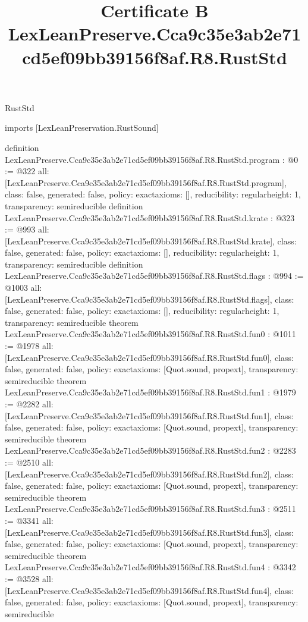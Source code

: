\begin{lexlean}{RustStd}
\title{Certificate B LexLeanPreserve.Cca9c35e3ab2e71cd5ef09bb39156f8af.R8.RustStd}
\begin{coremodule}
imports [LexLeanPreservation.RustSound]

definition LexLeanPreserve.Cca9c35e3ab2e71cd5ef09bb39156f8af.R8.RustStd.program : @0 := @322 {
  all: [LexLeanPreserve.Cca9c35e3ab2e71cd5ef09bb39156f8af.R8.RustStd.program],
  class: false,
  generated: false,
  policy: exact{axioms: []},
  reducibility: regular{height: 1},
  transparency: semireducible
}
definition LexLeanPreserve.Cca9c35e3ab2e71cd5ef09bb39156f8af.R8.RustStd.krate : @323 := @993 {
  all: [LexLeanPreserve.Cca9c35e3ab2e71cd5ef09bb39156f8af.R8.RustStd.krate],
  class: false,
  generated: false,
  policy: exact{axioms: []},
  reducibility: regular{height: 1},
  transparency: semireducible
}
definition LexLeanPreserve.Cca9c35e3ab2e71cd5ef09bb39156f8af.R8.RustStd.flags : @994 := @1003 {
  all: [LexLeanPreserve.Cca9c35e3ab2e71cd5ef09bb39156f8af.R8.RustStd.flags],
  class: false,
  generated: false,
  policy: exact{axioms: []},
  reducibility: regular{height: 1},
  transparency: semireducible
}
theorem LexLeanPreserve.Cca9c35e3ab2e71cd5ef09bb39156f8af.R8.RustStd.fun0 : @1011 := @1978 {
  all: [LexLeanPreserve.Cca9c35e3ab2e71cd5ef09bb39156f8af.R8.RustStd.fun0],
  class: false,
  generated: false,
  policy: exact{axioms: [Quot.sound, propext]},
  transparency: semireducible
}
theorem LexLeanPreserve.Cca9c35e3ab2e71cd5ef09bb39156f8af.R8.RustStd.fun1 : @1979 := @2282 {
  all: [LexLeanPreserve.Cca9c35e3ab2e71cd5ef09bb39156f8af.R8.RustStd.fun1],
  class: false,
  generated: false,
  policy: exact{axioms: [Quot.sound, propext]},
  transparency: semireducible
}
theorem LexLeanPreserve.Cca9c35e3ab2e71cd5ef09bb39156f8af.R8.RustStd.fun2 : @2283 := @2510 {
  all: [LexLeanPreserve.Cca9c35e3ab2e71cd5ef09bb39156f8af.R8.RustStd.fun2],
  class: false,
  generated: false,
  policy: exact{axioms: [Quot.sound, propext]},
  transparency: semireducible
}
theorem LexLeanPreserve.Cca9c35e3ab2e71cd5ef09bb39156f8af.R8.RustStd.fun3 : @2511 := @3341 {
  all: [LexLeanPreserve.Cca9c35e3ab2e71cd5ef09bb39156f8af.R8.RustStd.fun3],
  class: false,
  generated: false,
  policy: exact{axioms: [Quot.sound, propext]},
  transparency: semireducible
}
theorem LexLeanPreserve.Cca9c35e3ab2e71cd5ef09bb39156f8af.R8.RustStd.fun4 : @3342 := @3528 {
  all: [LexLeanPreserve.Cca9c35e3ab2e71cd5ef09bb39156f8af.R8.RustStd.fun4],
  class: false,
  generated: false,
  policy: exact{axioms: [Quot.sound, propext]},
  transparency: semireducible
}
\end{coremodule}
\end{lexlean}
